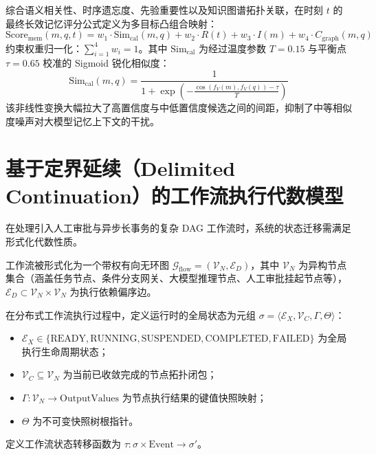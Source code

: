 \begin{definition}
    综合语义相关性、时序遗忘度、先验重要性以及知识图谱拓扑关联，在时刻 $t$ 的最终长效记忆评分公式定义为多目标凸组合映射：
    \begin{equation}
        \text{Score}_{\text{mem}}(m, q, t) = w_1 \cdot \text{Sim}_{\text{cal}}(m, q) + w_2 \cdot R(t) + w_3 \cdot I(m) + w_4 \cdot C_{\text{graph}}(m, q)
    \end{equation}
    约束权重归一化：$\sum_{i=1}^4 w_i = 1$。其中 $\text{Sim}_{\text{cal}}$ 为经过温度参数 $T=0.15$ 与平衡点 $\tau=0.65$ 校准的 Sigmoid 锐化相似度：
    \begin{equation}
        \text{Sim}_{\text{cal}}(m, q) = \frac{1}{1 + \exp\left( -\frac{\cos(f_V(m), f_V(q)) - \tau}{T} \right)}
    \end{equation}
    该非线性变换大幅拉大了高置信度与中低置信度候选之间的间距，抑制了中等相似度噪声对大模型记忆上下文的干扰。
\end{definition}

\section{基于定界延续（Delimited Continuation）的工作流执行代数模型}

在处理引入人工审批与异步长事务的复杂 DAG 工作流时，系统的状态迁移需满足形式化代数性质。

\begin{definition}[工作流有向无环图]
    工作流被形式化为一个带权有向无环图 $\mathcal{G}_{\text{flow}} = (\mathcal{V}_N, \mathcal{E}_D)$，其中 $\mathcal{V}_N$ 为异构节点集合（涵盖任务节点、条件分支网关、大模型推理节点、人工审批挂起节点等），$\mathcal{E}_D \subset \mathcal{V}_N \times \mathcal{V}_N$ 为执行依赖偏序边。
\end{definition}

\begin{definition}[定界延续状态机]
    在分布式工作流执行过程中，定义运行时的全局状态为元组 $\sigma = \langle \mathcal{E}_X, \mathcal{V}_C, \Gamma, \Theta \rangle$：
    \begin{itemize}
        \item $\mathcal{E}_X \in \{\text{READY}, \text{RUNNING}, \text{SUSPENDED}, \text{COMPLETED}, \text{FAILED}\}$ 为全局执行生命周期状态；
        \item $\mathcal{V}_C \subseteq \mathcal{V}_N$ 为当前已收敛完成的节点拓扑闭包；
        \item $\Gamma: \mathcal{V}_N \rightarrow \text{OutputValues}$ 为节点执行结果的键值快照映射；
        \item $\Theta$ 为不可变快照树根指针。
    \end{itemize}
    定义工作流状态转移函数为 $\tau: \sigma \times \text{Event} \rightarrow \sigma'$。
\end{definition}

